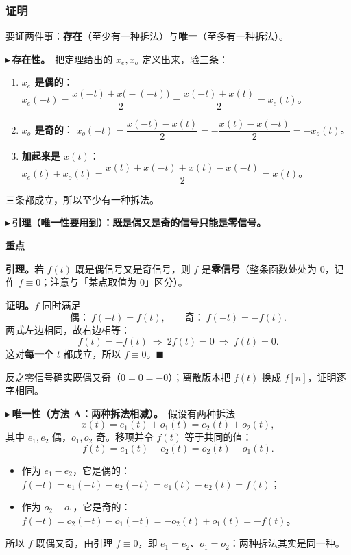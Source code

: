 \documentclass[UTF8,a4paper,11pt]{ctexart}
\newenvironment{remember}{\begin{rememberbox}\textbf{重点}\par\smallskip}{\end{rememberbox}}
\newcounter{ex}[section]
\newcommand{\point}[1]{\par\addvspace{1ex}\noindent\textcolor{ptteal}{$\blacktriangleright$\,\textbf{#1}}\ }
\renewcommand{\paragraph}[1]{\point{#1}}
\begin{document}
\subsubsection*{证明}
要证两件事：\textbf{存在}（至少有一种拆法）与\textbf{唯一}（至多有一种拆法）。

\paragraph{存在性。}把定理给出的 $x_e,x_o$ 定义出来，验三条：
\begin{enumerate}[nosep]
\item \textbf{$x_e$ 是偶的}：
$x_e(-t)=\dfrac{x(-t)+x\bigl(-(-t)\bigr)}{2}=\dfrac{x(-t)+x(t)}{2}=x_e(t)$。
\item \textbf{$x_o$ 是奇的}：
$x_o(-t)=\dfrac{x(-t)-x(t)}{2}=-\dfrac{x(t)-x(-t)}{2}=-x_o(t)$。
\item \textbf{加起来是 $x(t)$}：
$x_e(t)+x_o(t)=\dfrac{x(t)+x(-t)+x(t)-x(-t)}{2}=x(t)$。
\end{enumerate}
三条都成立，所以至少有一种拆法。

\paragraph{引理（唯一性要用到）：既是偶又是奇的信号只能是零信号。}
\begin{remember}
\textbf{引理。}若 $f(t)$ 既是偶信号又是奇信号，则 $f$ 是\textbf{零信号}（整条函数处处为 $0$，记作 $f\equiv0$；注意与「某点取值为 $0$」区分）。
\end{remember}

\textbf{证明。}$f$ 同时满足
\[
\text{偶：}\ f(-t)=f(t),\qquad \text{奇：}\ f(-t)=-f(t).
\]
两式左边相同，故右边相等：
\[
f(t)=-f(t)\ \Longrightarrow\ 2f(t)=0\ \Longrightarrow\ f(t)=0 .
\]
这对\textbf{每一个} $t$ 都成立，所以 $f\equiv0$。$\blacksquare$

反之零信号确实既偶又奇（$0=0=-0$）；离散版本把 $f(t)$ 换成 $f[n]$，证明逐字相同。

\paragraph{唯一性（方法 A：两种拆法相减）。}假设有两种拆法
\[
x(t)=e_1(t)+o_1(t)=e_2(t)+o_2(t),
\]
其中 $e_1,e_2$ 偶，$o_1,o_2$ 奇。移项并令 $f(t)$ 等于共同的值：
\[
f(t)=e_1(t)-e_2(t)=o_2(t)-o_1(t).
\]
\begin{itemize}[nosep]
\item 作为 $e_1-e_2$，它是偶的：$f(-t)=e_1(-t)-e_2(-t)=e_1(t)-e_2(t)=f(t)$；
\item 作为 $o_2-o_1$，它是奇的：$f(-t)=o_2(-t)-o_1(-t)=-o_2(t)+o_1(t)=-f(t)$。
\end{itemize}
所以 $f$ 既偶又奇，由引理 $f\equiv0$，即 $e_1=e_2$、$o_1=o_2$：两种拆法其实是同一种。
\end{document}
